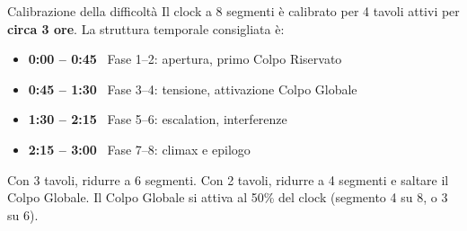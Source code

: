 \begin{rulebox}[GoldRPG]{Calibrazione della difficoltà}
Il clock a 8 segmenti è calibrato per 4 tavoli attivi per \textbf{circa 3 ore}.
La struttura temporale consigliata è:
\begin{itemize}
  \item \textbf{0:00 – 0:45} \ Fase 1–2: apertura, primo Colpo Riservato
  \item \textbf{0:45 – 1:30} \ Fase 3–4: tensione, attivazione Colpo Globale
  \item \textbf{1:30 – 2:15} \ Fase 5–6: escalation, interferenze
  \item \textbf{2:15 – 3:00} \ Fase 7–8: climax e epilogo
\end{itemize}
Con 3 tavoli, ridurre a 6 segmenti.
Con 2 tavoli, ridurre a 4 segmenti e saltare il Colpo Globale.
Il Colpo Globale si attiva al 50\% del clock (segmento 4 su 8, o 3 su 6).
\end{rulebox}
